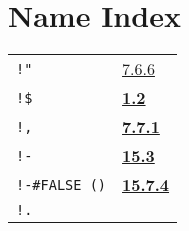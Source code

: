 \documentclass[a4paper,]{article}
\begin{document}
\section{Name Index}\label{name-index}

\begin{longtable}[]{@{}ll@{}}
\toprule
\begin{minipage}[t]{0.24\columnwidth}\raggedright\strut
\texttt{!"}\strut
\end{minipage} & \begin{minipage}[t]{0.70\columnwidth}\raggedright\strut
\href{07-structured-objects.md\#766-string-the-primtype-and-character-1}{7.6.6}\strut
\end{minipage}\tabularnewline
\begin{minipage}[t]{0.24\columnwidth}\raggedright\strut
\texttt{!\$}\strut
\end{minipage} & \begin{minipage}[t]{0.70\columnwidth}\raggedright\strut
\textbf{\href{01-basic-introduction.md\#12-typing-1}{1.2}}\strut
\end{minipage}\tabularnewline
\begin{minipage}[t]{0.24\columnwidth}\raggedright\strut
\texttt{!,}\strut
\end{minipage} & \begin{minipage}[t]{0.70\columnwidth}\raggedright\strut
\textbf{\href{07-structured-objects.md\#771-representation-1}{7.7.1}}\strut
\end{minipage}\tabularnewline
\begin{minipage}[t]{0.24\columnwidth}\raggedright\strut
\texttt{!-}\strut
\end{minipage} & \begin{minipage}[t]{0.70\columnwidth}\raggedright\strut
\textbf{\href{15-lexical-blocking.md\#153-read-and-oblists}{15.3}}\strut
\end{minipage}\tabularnewline
\begin{minipage}[t]{0.24\columnwidth}\raggedright\strut
\texttt{!-\#FALSE\ ()}\strut
\end{minipage} & \begin{minipage}[t]{0.70\columnwidth}\raggedright\strut
\textbf{\href{15-lexical-blocking.md\#1574-atom}{15.7.4}}\strut
\end{minipage}\tabularnewline
\begin{minipage}[t]{0.24\columnwidth}\raggedright\strut
\texttt{!.}\strut
\end{minipage} & \begin{minipage}[t]{0.70\columnwidth}\raggedright\strut

\end{minipage}
\end{longtable}
\end{document}
